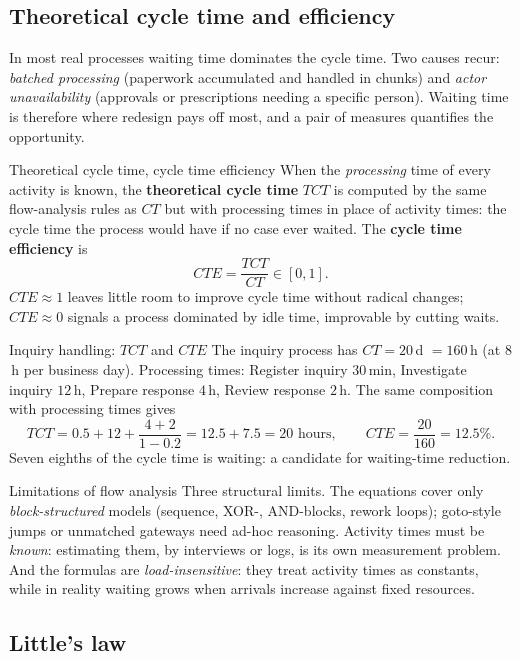 \subsection{Theoretical cycle time and efficiency}

In most real processes waiting time dominates the cycle time. Two causes recur: \emph{batched processing} (paperwork accumulated and handled in chunks) and \emph{actor unavailability} (approvals or prescriptions needing a specific person). Waiting time is therefore where redesign pays off most, and a pair of measures quantifies the opportunity.
\begin{definitionbox}{Theoretical cycle time, cycle time efficiency}
When the \emph{processing} time of every activity is known, the \textbf{theoretical cycle time} $TCT$ is computed by the same flow-analysis rules as $CT$ but with processing times in place of activity times: the cycle time the process would have if no case ever waited. The \textbf{cycle time efficiency} is
\[CTE = \frac{TCT}{CT} \in [0, 1].\]
$CTE \approx 1$ leaves little room to improve cycle time without radical changes; $CTE \approx 0$ signals a process dominated by idle time, improvable by cutting waits.
\end{definitionbox}
\begin{examplebox}{Inquiry handling: $TCT$ and $CTE$}
The inquiry process has $CT = 20$\,d $= 160$\,h (at $8$\,h per business day). Processing times: Register inquiry $30$\,min, Investigate inquiry $12$\,h, Prepare response $4$\,h, Review response $2$\,h. The same composition with processing times gives
\[TCT = 0.5 + 12 + \frac{4 + 2}{1 - 0.2} = 12.5 + 7.5 = 20 \text{ hours}, \qquad CTE = \frac{20}{160} = 12.5\%.\]
Seven eighths of the cycle time is waiting: a candidate for waiting-time reduction.
\end{examplebox}

\begin{notebox}{Limitations of flow analysis}
Three structural limits. The equations cover only \emph{block-structured} models (sequence, XOR-, AND-blocks, rework loops); goto-style jumps or unmatched gateways need ad-hoc reasoning. Activity times must be \emph{known}: estimating them, by interviews or logs, is its own measurement problem. And the formulas are \emph{load-insensitive}: they treat activity times as constants, while in reality waiting grows when arrivals increase against fixed resources.
\end{notebox}

\subsection{Little's law}


